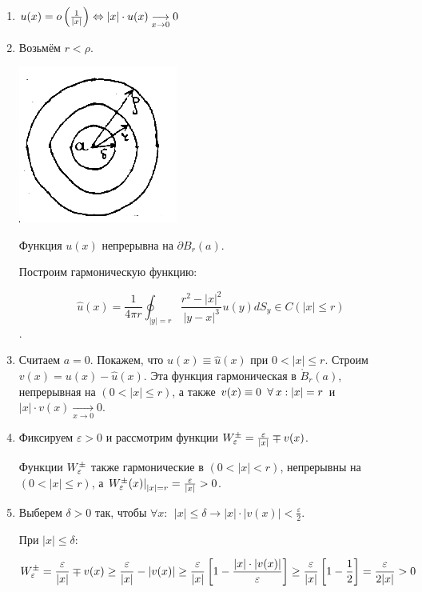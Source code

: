 \begin{enumerate}
\item{ 
	
	$u(x) = o \left(\frac{1}{|x|}\right) \Leftrightarrow |x| \cdot u(x) 
	\underset{x \to 0}{\longrightarrow} 0$
}

\item{
Возьмём $r<\rho$. 
\begin{center}
\includegraphics{22_1_new}
\end{center}
Функция $u(x)$ непрерывна на $\partial B_r (a)$.

Построим гармоническую функцию:

$$\hat{u}(x) = \frac{1}{4 \pi r} 
\oint_{|y|=r}\frac{r^2 - |x|^2}{|y-x|^3} u(y) dS_y \in 
C(|x| \le r)$$.

}


\item{

Считаем $a=0$. Покажем, что $u(x) \equiv \hat{u}(x)$ при $0<|x|\le r$. Строим $v(x) = u(x) - \hat{u}(x)$. Эта функция гармоническая в $\mathring{B}_r(a)$, непрерывная на $(0<|x| \le r)$, а также 
$v(x) \equiv 0 \;\;\forall\: x: |x|=r$ и $|x| \cdot v(x) \underset{x \to 0}{\longrightarrow} 0$. 
 
}

\item{

Фиксируем $\varepsilon >0$ и рассмотрим функции $W_\varepsilon^{\pm} =
\frac{\varepsilon}{|x|} \mp v(x)$.

Функции $W_\varepsilon^{\pm}$ также гармонические в $(0<|x|<r)$, непрерывны на $(0<|x| \le r)$, а 
$\left.W_\varepsilon^{\pm}(x) \right|_{|x|=r} =\frac{\varepsilon}{|x|} >0$.
}

\item{

Выберем $\delta > 0 $ так, чтобы $\forall x:~~ |x| \le \delta \to |x| \cdot |v(x)| < \frac{\varepsilon}{2}$.

При $|x|\le \delta$: 

$$
W_\varepsilon^{\pm} = \frac{\varepsilon}{|x|} \mp v(x) \ge 
\frac{\varepsilon}{|x|} - |v(x)|
\ge 
\frac{\varepsilon}{|x|}\left[1 - \frac{|x|\cdot |v(x)|}{\varepsilon}\right]
\ge
\frac{\varepsilon}{|x|}\left[1-\frac{1}{2}\right]
=
\frac{\varepsilon}{2|x|} >0
$$
}




\end{enumerate}
